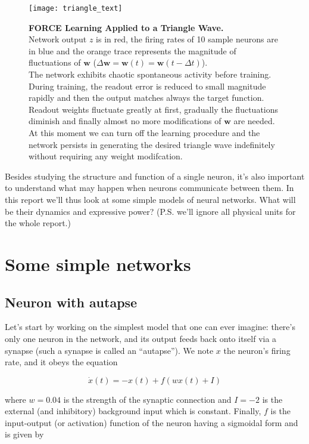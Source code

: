 \begin{figure}[H]
  \centering
  \texttt{[image: triangle\_text]}
  \vspace{0.4em}
  \caption{
    \textbf{FORCE Learning Applied to a Triangle Wave.}\\[0.1 em]
    Network output $z$ is in red, the firing rates of 10 sample neurons
    are in blue and the orange trace represents the magnitude of
    fluctuations of $\mathbf{w}$ 
    ($\Delta \mathbf{w} = \mathbf{w}(t) = \mathbf{w}(t - \Delta t)$).\\[0.1em]
    The network exhibits chaotic spontaneous activity before training.
    During training, the readout error is reduced to small magnitude 
    rapidly and then the output matches always the target function.
    Readout weights fluctuate greatly at first, gradually the fluctuations
    diminish and finally almost no more modifications of $\mathbf{w}$ are 
    needed.
    At this moment we can turn off the learning procedure and the network 
    persists in generating the desired triangle wave indefinitely
    without requiring any weight modifcation.
  }
  \label{fig: triangle}
\end{figure}

\iffalse

Besides studying the structure and function of a single neuron, it's also
important to understand what may happen when neurons communicate between them.
In this report we'll thus look at some simple models of neural networks.
What will be their dynamics and expressive power? 
(P.S. we'll ignore all physical units for the whole report.)

\section{Some simple networks}

\subsection{Neuron with autapse}

Let's start by working on the simplest model that one can ever imagine:
there's only one neuron in the network, and its output feeds back onto 
itself via a synapse (such a synapse is called an ``autapse''). 
We note $x$ the neuron's firing rate, and it obeys the equation

\[\dot{x}(t) = -x(t) + f(wx(t)+I)\]

\noindent
where $w = 0.04$ is the strength of the synaptic connection and $I = -2$ 
is the external (and inhibitory) background input which is constant.
Finally, $f$ is the input-output (or activation) function of the neuron having
a sigmoidal form and is given by

